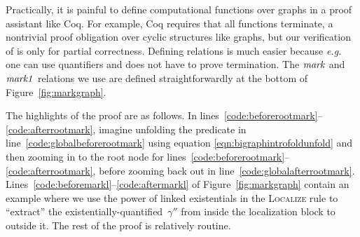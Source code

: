 Practically, it is painful to define computational functions over graphs in a proof assistant like Coq.  For example, Coq requires that all functions terminate, a nontrivial proof obligation over cyclic structures like graphs, but our verification of  is only for partial correctness.  Defining relations is much easier because \emph{e.g.} one can use quantifiers and does not have to prove termination.
The $\mathit{mark}$ and $\mathit{mark1}$ relations we use are defined straightforwardly at the bottom of Figure~\ref{fig:markgraph}.

The highlights of the proof are as follows.
In lines~\ref{code:beforerootmark}--\ref{code:afterrootmark}, imagine unfolding the  predicate in line~\ref{code:globalbeforerootmark} using equation \eqref{eqn:bigraphintrofoldunfold} and then zooming in to the root node  for lines~\ref{code:beforerootmark}--\ref{code:afterrootmark}, before zooming back out in line~\ref{code:globalafterrootmark}.
Lines~\ref{code:beforemarkl}--\ref{code:aftermarkl} of Figure~\ref{fig:markgraph} contain an example where we use the power of linked existentials in the \textsc{Localize} rule to ``extract'' the existentially-quantified~$\gamma''$ from inside the localization block to outside it.
The rest of the proof is relatively routine.


